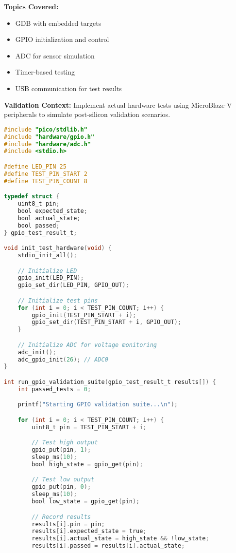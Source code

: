 \documentclass[11pt,a4paper]{article}
\begin{document}
\textbf{Topics Covered:}
\begin{itemize}
    \item GDB with embedded targets
    \item GPIO initialization and control
    \item ADC for sensor simulation
    \item Timer-based testing
    \item USB communication for test results
\end{itemize}

\textbf{Validation Context:}
Implement actual hardware tests using MicroBlaze-V peripherals to simulate post-silicon validation scenarios.

\begin{lstlisting}[language=C, caption=Day 5 Example: GPIO Validation Test]
#include "pico/stdlib.h"
#include "hardware/gpio.h"
#include "hardware/adc.h"
#include <stdio.h>

#define LED_PIN 25
#define TEST_PIN_START 2
#define TEST_PIN_COUNT 8

typedef struct {
    uint8_t pin;
    bool expected_state;
    bool actual_state;
    bool passed;
} gpio_test_result_t;

void init_test_hardware(void) {
    stdio_init_all();

    // Initialize LED
    gpio_init(LED_PIN);
    gpio_set_dir(LED_PIN, GPIO_OUT);

    // Initialize test pins
    for (int i = 0; i < TEST_PIN_COUNT; i++) {
        gpio_init(TEST_PIN_START + i);
        gpio_set_dir(TEST_PIN_START + i, GPIO_OUT);
    }

    // Initialize ADC for voltage monitoring
    adc_init();
    adc_gpio_init(26); // ADC0
}

int run_gpio_validation_suite(gpio_test_result_t results[]) {
    int passed_tests = 0;

    printf("Starting GPIO validation suite...\n");

    for (int i = 0; i < TEST_PIN_COUNT; i++) {
        uint8_t pin = TEST_PIN_START + i;

        // Test high output
        gpio_put(pin, 1);
        sleep_ms(10);
        bool high_state = gpio_get(pin);

        // Test low output
        gpio_put(pin, 0);
        sleep_ms(10);
        bool low_state = gpio_get(pin);

        // Record results
        results[i].pin = pin;
        results[i].expected_state = true;
        results[i].actual_state = high_state && !low_state;
        results[i].passed = results[i].actual_state;


\end{lstlisting}
\end{document}
